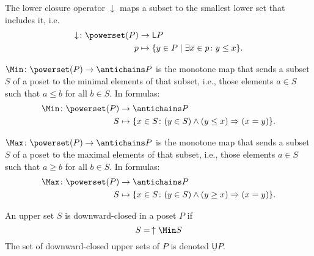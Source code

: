 \begin{definition}
The lower closure operator $\downarrow$ maps a subset to the smallest lower set that includes it, i.e.
\begin{equation}
    \begin{aligned}
    \downarrow\colon \powerset(P)&\to \mathsf{L}P\\
    p&\mapsto \{ y\in P \mid \exists x\in p \colon y\leq x\}.
    \end{aligned}
\end{equation}
\end{definition}




\begin{definition}
\label{def:Min}
$\Min \colon \powerset(P) \to \antichains P$ is the monotone map that sends a subset $S$ of a poset to the minimal elements of that subset, i.e., those elements $a \in S$ such that $a \leq b$ for all $b \in S$. In formulas:
\begin{equation}
    \begin{aligned}
    \Min \colon \powerset(P) &\to \antichains P\\
    S&\mapsto \{ x\in S\colon (y\in S)\wedge(y\leq x)\Rightarrow (x=y)\}.
    \end{aligned}
\end{equation}
\end{definition}
\begin{definition}
\label{def:Max}
$\Max \colon \powerset(P) \to \antichains P$ is the monotone map that sends a subset $S$ of a poset to the maximal elements of that subset, i.e., those elements $a \in S$ such that $a \geq b$ for all $b \in S$. In formulas:
\begin{equation}
    \begin{aligned}
    \Max \colon \powerset(P) &\to \antichains P\\
    S&\mapsto \{ x\in S\colon (y\in S)\wedge(y\geq x)\Rightarrow (x=y)\}.
    \end{aligned}
\end{equation}
\end{definition}


\begin{definition}
\label{def:downward-closed-upperset}
An upper set $S$ is downward-closed in a poset $P$ if
\begin{equation}
    S =\, \uparrow \Min S
\end{equation}
The set of downward-closed upper sets of $P$ is denoted $\underline{\mathsf{U}}P$.
\end{definition}

